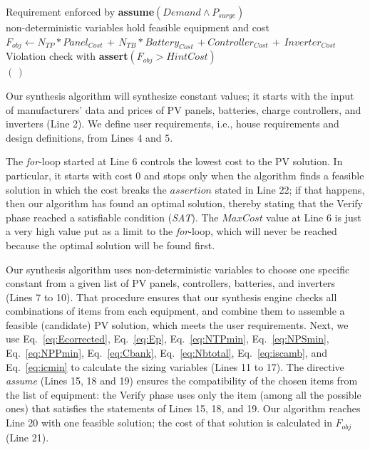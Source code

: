 \documentclass[runningheads]{llncs}
\begin{document}
\begin{algorithm}
\begin{algorithmic}[1]
\begin{scriptsize}
	\STATE Requirement enforced by \textbf{assume}$(Demand \wedge P_{surge})$ \\
	\STATE non-deterministic variables hold feasible equipment and cost \\
	\STATE $F_{obj} \leftarrow N_{TP}*Panel_{Cost} \, + \, N_{TB}*Battery_{Cost} \, + Controller_{Cost} \, + \, Inverter_{Cost}$ \\
	\STATE Violation check with \textbf{assert}$(F_{obj} > HintCost)$ \\
 \ENDFOR
 \RETURN $(\,)$ 
 \end{scriptsize}
 \end{algorithmic} 
 \label{alg:verification-algorithm}
 \end{algorithm}
%
Our synthesis algorithm will synthesize constant values; it starts with the input of manufacturers' data and prices of PV panels, batteries, charge controllers, and inverters (Line 2). We define user requirements, i.e., house requirements and design definitions, from Lines 4 and 5. 

The \textit{for}-loop started at Line 6 controls the lowest cost to the PV solution. In particular, it starts with cost $0$ and stops only when the algorithm finds a feasible solution in which the cost breaks the $assertion$ stated in Line 22; if that happens, then our algorithm has found an optimal solution, thereby stating that the {\sc Verify} phase reached a satisfiable condition (\textit{SAT}). The $MaxCost$ value at Line 6 is just a very high value put as a limit to the \textit{for}-loop, which will never be reached because the optimal solution will be found first.

Our synthesis algorithm uses non-deterministic variables to choose one specific constant from a given list of PV panels, controllers, batteries, and inverters (Lines 7 to 10). That procedure ensures that our synthesis engine checks all combinations of items from each equipment, and combine them to assemble a feasible (candidate) PV solution, which meets the user requirements.
%
Next, we use Eq.~\ref{eq:Ecorrected}, Eq.~\ref{eq:Ep}, Eq.~\ref{eq:NTPmin}, Eq.~\ref{eq:NPSmin}, Eq.~\ref{eq:NPPmin}, Eq.~\ref{eq:Cbank}, Eq.~\ref{eq:Nbtotal}, Eq.~\ref{eq:iscamb}, and Eq.~\ref{eq:icmin} to calculate the sizing variables (Lines 11 to 17). The directive \textit{assume} (Lines 15, 18 and 19) ensures the compatibility of the chosen items from the list of equipment: the {\sc Verify} phase uses only the item (among all the possible ones) that satisfies the statements of Lines 15, 18, and 19. Our algorithm reaches Line 20 with one feasible solution; the cost of that solution is calculated in $F_{obj}$ (Line 21). 
\end{document}
